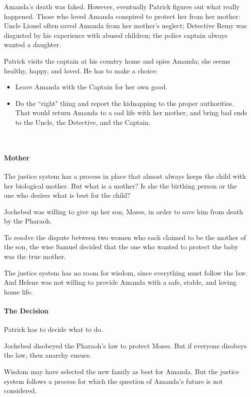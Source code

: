 Amanda's death was faked. However, eventually Patrick figures out what really happened. Those who loved Amanda conspired to protect her from her mother: Uncle Lionel often saved Amanda from her mother's neglect; Detective Remy was disgusted by his experience with abused children; the police captain always wanted a daughter.

Patrick visits the captain at his country home and spies Amanda; she seems healthy, happy, and loved. He has to make a choice:

\begin{itemize}
\item Leave Amanda with the Captain for her own good. 
\item Do the ``right" thing and report the kidnapping to the proper authorities. That would return Amanda to a sad life with her mother, and bring bad ends to the Uncle, the Detective, and the Captain. 
\end{itemize}
 

\paragraph{Mother}
The justice system has a process in place that almost always keeps the child with her biological mother. But what is a mother? Is she the birthing person or the one who desires what is best for the child?

Jochebed was willing to give up her son, Moses, in order to save him from death by the Pharaoh.

To resolve the dispute between two women who each claimed to be the mother of the son, the wise Samuel decided that the one who wanted to protect the baby was the true mother.

The justice system has no room for wisdom, since everything must follow the law. And Helene was not willing to provide Amanda with a safe, stable, and loving home life.

\paragraph{The Decision}
Patrick has to decide what to do.

Jochebed disobeyed the Pharaoh's law to protect Moses. But if everyone disobeys the law, then anarchy ensues.

Wisdom may have selected the new family as best for Amanda. But the justice system follows a process for which the question of Amanda's future is not considered.

